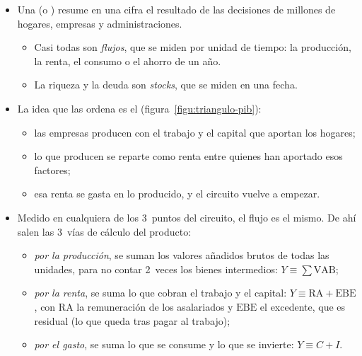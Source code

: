 \documentclass[11pt]{article}
\begin{document}
\begin{itemize}
\item Una  (o ) resume en una cifra el resultado de las decisiones de millones de hogares, empresas y administraciones.
  \begin{itemize}
  \item Casi todas son \emph{flujos}, que se miden por unidad de tiempo: la producción, la renta, el consumo o el ahorro de un año.
  \item La riqueza y la deuda son \emph{stocks}, que se miden en una fecha.
  \end{itemize}
\item La idea que las ordena es el  (figura~\ref{figu:triangulo-pib}):
  \begin{itemize}
  \item las empresas producen con el trabajo y el capital que aportan los hogares;
  \item lo que producen se reparte como renta entre quienes han aportado esos factores;
  \item esa renta se gasta en lo producido, y el circuito vuelve a empezar.
  \end{itemize}
\item Medido en cualquiera de los 3~puntos del circuito, el flujo es el mismo. De ahí salen las 3~vías de cálculo del producto:
  \begin{itemize}
  \item \emph{por la producción}, se suman los valores añadidos brutos de todas las unidades, para no contar 2~veces los bienes intermedios: $Y\equiv\sum\mathrm{VAB}$;
  \item \emph{por la renta}, se suma lo que cobran el trabajo y el capital: $Y\equiv\mathrm{RA}+\mathrm{EBE}$, con $\mathrm{RA}$ la remuneración de los asalariados y $\mathrm{EBE}$ el excedente, que es residual (lo que queda tras pagar al trabajo);
  \item \emph{por el gasto}, se suma lo que se consume y lo que se invierte: $Y\equiv C+I$.
  \end{itemize}
\end{itemize}

\begin{infografia}[H]
\centering
\caption{El flujo circular de la renta: producción, renta y gasto}\label{figu:triangulo-pib}
\end{infografia}
\end{document}

